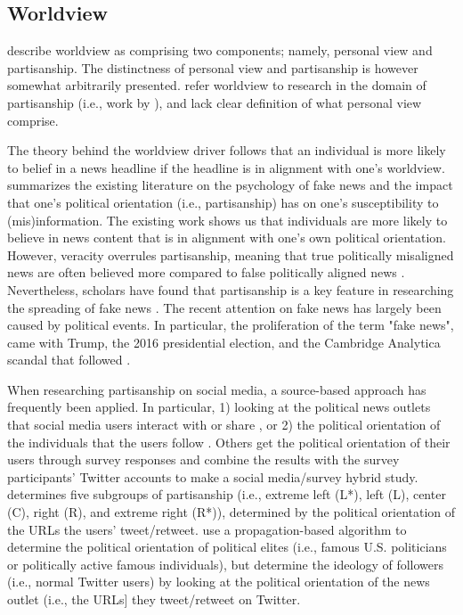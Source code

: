 \documentclass[
10pt, %
a4paper, %
oneside, %
headinclude,footinclude, %
] {book}%
\begin{document}

\subsection{Worldview}
\label{subsec:worldview_theory}
\cite{psychological_drivers_misinformation} describe worldview as comprising two components; namely, personal view and partisanship. The distinctness of personal view and partisanship is however somewhat arbitrarily presented. \cite{psychological_drivers_misinformation} refer worldview to research in the domain of partisanship (i.e., work by \cite{PENNYCOOK2021388}), and lack clear definition of what personal view comprise. 

The theory behind the worldview driver follows that an individual is more likely to belief in a news headline if the headline is in alignment with one's worldview. \cite{PENNYCOOK2021388} summarizes the existing literature on the psychology of fake news and the impact that one's political orientation (i.e., partisanship) has on one's susceptibility to (mis)information. The existing work shows us that individuals are more likely to believe in news content that is in alignment with one's own political orientation. However, veracity overrules partisanship, meaning that true politically misaligned news are often believed more compared to false politically aligned news \citep{PENNYCOOK2021388}. Nevertheless, scholars have found that partisanship is a key feature in researching the spreading of fake news \citep{grinberg2019partisanship, osmundsen2021partisan, mosleh2021elites}. The recent attention on fake news has largely been caused by political events. In particular, the proliferation of the term "fake news", came with Trump, the 2016 presidential election, and the Cambridge Analytica scandal that followed \cite{lazer2018science}. 

When researching partisanship on social media, a source-based approach has frequently been applied. In particular, 1) looking at the political news outlets that social media users interact with or share \citep{mosleh2021elites, grinberg2019partisanship}, or 2) the political orientation of the individuals that the users follow \citep{halberstam2016homophily}. Others get the political orientation of their users through survey responses and combine the results with the survey participants' Twitter accounts \citep{osmundsen2021partisan} to make a social media/survey hybrid study. \cite{grinberg2019partisanship} determines five  subgroups of partisanship (i.e., extreme left (L*), left (L), center (C),
right (R), and extreme right (R*)), determined by the political orientation of the URLs the users' tweet/retweet. \cite{mosleh2021elites} use a propagation-based algorithm to determine the political orientation of political elites (i.e., famous U.S. politicians or politically active famous individuals), but determine the ideology of followers (i.e., normal Twitter users) by looking at the political orientation of the news outlet (i.e., the URLs] they tweet/retweet on Twitter. 
\end{document}
